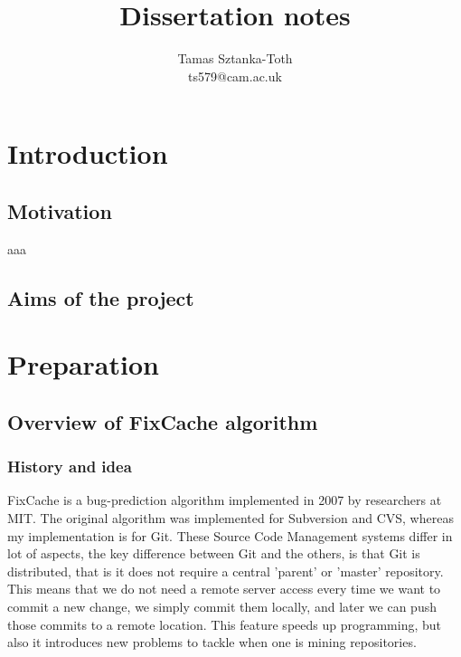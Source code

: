 \documentclass[12pt,twoside,notitlepage]{report}
\title{Dissertation notes}
\author{Tamas Sztanka-Toth \\ ts579@cam.ac.uk}
\newcommand{\fxch}{FixCache }
\begin{document}
\setcounter{page}{1}
\pagestyle{plain}

\maketitle{}
\tableofcontents
\cleardoublepage        %


\listoffigures
\cleardoublepage
\setcounter{page}{1}
\pagestyle{headings}
\chapter{Introduction}
\section{Motivation}
aaa
\section{Aims of the project}
\cleardoublepage
\chapter{Preparation}
\section{Overview of \fxch algorithm}
\subsection{History and idea}
\fxch is a bug-prediction algorithm implemented in 2007 by researchers at MIT\cite{FixCache}. The original algorithm was implemented for Subversion and CVS, whereas my implementation is for Git. These Source Code Management systems differ in lot of aspects, the key difference between Git and the others, is that Git is distributed, that is it does not require a central 'parent' or 'master' repository. This means that we do not need a remote server access every time we want to commit a new change, we simply commit them locally, and later we can push those commits to a remote location. This feature speeds up programming, but also it introduces new problems to tackle when one is mining repositories\cite{Git}.
\end{document}
